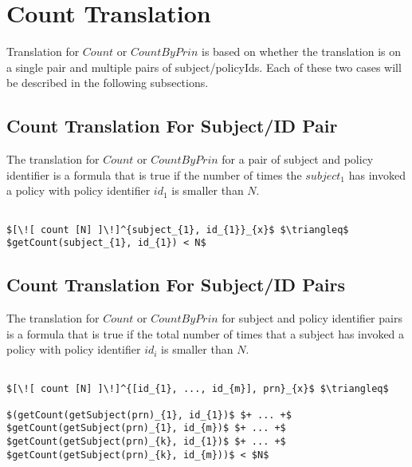 \section{Count Translation}
Translation for $Count$ or $CountByPrin$ is based on whether the translation is on a single pair and multiple pairs of subject/policyIds. Each of these two cases will be described in the following subsections.

\subsection{Count Translation For Subject/ID Pair}
The translation for $Count$ or $CountByPrin$ for a pair of subject and policy identifier is a formula that is true if the number of times the $subject_{1}$ has invoked a policy with policy identifier $id_{1}$ is smaller than $N$.

\lstset{mathescape, language=AST}  
\begin{lstlisting}[frame=single, caption={Count Translation {$\colon$} subject and policyId pair},label={lst:transcountSinglePair}]

$[\![ count [N] ]\!]^{subject_{1}, id_{1}}_{x}$ $\triangleq$ $getCount(subject_{1}, id_{1}) < N$
\end{lstlisting}

\subsection{Count Translation For Subject/ID Pairs}
The translation for $Count$ or $CountByPrin$ for subject and policy identifier pairs is a formula that is true if the total number of times that a subject has invoked a policy with policy identifier $id_{i}$ is smaller than $N$.

\lstset{mathescape, language=AST}  
\begin{lstlisting}[frame=single, caption={Count Translation {$\colon$} subject and policyId pairs},label={lst:transcountPairs}]

$[\![ count [N] ]\!]^{[id_{1}, ..., id_{m}], prn}_{x}$ $\triangleq$ 

$(getCount(getSubject(prn)_{1}, id_{1})$ $+ ... +$ $getCount(getSubject(prn)_{1}, id_{m})$ $+ ... +$ $getCount(getSubject(prn)_{k}, id_{1})$ $+ ... +$ $getCount(getSubject(prn)_{k}, id_{m}))$ < $N$


\end{lstlisting}



